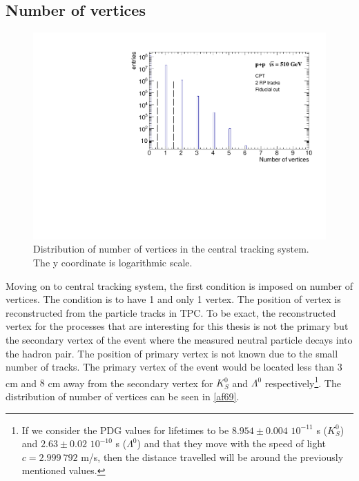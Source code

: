 \subsection{Number of vertices}
\label{posZ}

\FloatBarrier
\begin{figure}[ht]
    \centering
    \includegraphics[width=1\textwidth]{figures/hNVertices.pdf}
    \caption[Distribution of number of vertices in the central tracking system]{Distribution of number of vertices in the central tracking system. The y coordinate is logarithmic scale.}
    \label{af69}
\end{figure}
\FloatBarrier

Moving on to central tracking system, the first condition is imposed on number of vertices. The condition is to have 1 and only 1 vertex. The position of vertex is reconstructed from the particle tracks in TPC. To be exact, the reconstructed vertex for the processes that are interesting for this thesis is not the primary but the secondary vertex of the event where the measured neutral particle decays into the hadron pair. The position of primary vertex is not known due to the small number of tracks. The primary vertex of the event would be located less than $3$ cm and $8$ cm away from the secondary vertex for $K^0_S$ and $\Lambda^0$ respectively\footnote{If we consider the PDG values \cite{zyla} for lifetimes to be $8.954 \pm 0.004$ $10^{-11}$ s ($K^0_S$) and $2.63 \pm 0.02$ $10^{-10}$ s ($\Lambda^0$) and that they move with the speed of light $c=2.999~792$ m/s, then the distance travelled will be around the previously mentioned values.}. The distribution of number of vertices can be seen in \autoref{af69}.
